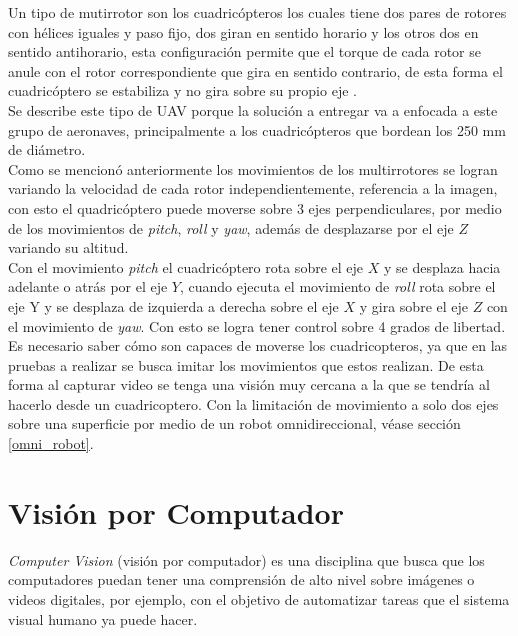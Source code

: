 \documentclass{iccmemoria}
\begin{document}
Un tipo de mutirrotor son los cuadricópteros los cuales tiene dos pares de rotores con hélices iguales y paso fijo, dos giran en sentido horario y los otros dos en sentido antihorario, esta configuración permite que el torque de cada rotor se anule con el rotor correspondiente que gira en sentido contrario, de esta forma el cuadricóptero se estabiliza y no gira sobre su propio eje \cite{AllenQuadcopters}.\\

Se describe este tipo de UAV porque la solución a entregar va a enfocada a este grupo de aeronaves, principalmente a los cuadricópteros que bordean los 250 mm de diámetro.\\  

Como se mencionó anteriormente los movimientos de los multirrotores se logran variando la velocidad de cada rotor independientemente, referencia a la imagen, con esto el quadricóptero puede moverse sobre 3 ejes perpendiculares, por medio de los movimientos de \emph{pitch}, \emph{roll} y \emph{yaw}, además de desplazarse por el eje $Z$ variando su altitud.\\

Con el movimiento \emph{pitch} el cuadricóptero rota sobre el eje $X$ y se desplaza hacia adelante o atrás por el eje $Y$, cuando ejecuta el movimiento de \emph{roll} rota sobre el eje Y y se desplaza de izquierda a derecha sobre el eje $X$ y gira sobre el eje $Z$ con el movimiento de \emph{yaw}. Con esto se logra tener control sobre 4 grados de libertad.\\

Es necesario saber cómo son capaces de moverse los cuadricopteros, ya que en las pruebas a realizar se busca imitar los movimientos que estos realizan. De esta forma al capturar video se tenga una visión muy cercana a la que se tendría al hacerlo desde un cuadricoptero. Con la limitación de movimiento a solo dos ejes sobre una superficie por medio de un robot omnidireccional, véase sección \ref{omni_robot}.\\

\section{Visión por Computador}

\emph{Computer Vision} (visión por computador) es una disciplina que busca que los computadores puedan tener una comprensión de alto nivel sobre imágenes o videos digitales, por ejemplo, con el objetivo de automatizar tareas que el sistema visual humano ya puede hacer\cite{ballard1982computer, vandoni1996proceedings, sonka2008image}.\\
\end{document}
